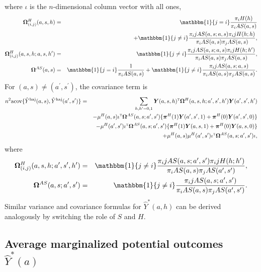 \documentclass{article}
\def\T{{\textsc{t}}}
\newcommand{\acov}{\textup{acov}}
\newcommand{\bY}{\boldsymbol{Y}}
\newcommand{\bpi}{\boldsymbol{\pi}}
\newcommand{\bOmega}{\boldsymbol{\Omega}}
\newcommand{\haj}{\textup{haj}}
\newcommand{\indicator}{\mathbbm{1}}
\newcommand{\ashprime}{a^{\prime},s^{\prime},h^{\prime}}
\newcommand{\pscore}[1]{\pi_{#1}}
\begin{document}
where $\iota$ is the $n$-dimensional column vector with all ones, 
\begin{eqnarray*}
    \bOmega^{H}_{(i,j)}(a,s,h) &=& \indicator\{j=i\} \frac{\pscore{i}{H}(h)}{\pscore{i}{AS}(a,s)} \\
    &&+ \indicator\{j\neq i\} \frac{\pscore{i}{j}{AS}(a,s;a,s)\pscore{i}{j}{H}(h;h)}{\pscore{i}{AS}(a,s)\pscore{j}{}{AS}(a,s)}, \\
    \bOmega^{H}_{(i,j)}(a,s,h;a,s,h^{\prime}) &=& \indicator\{j\neq i\} \frac{\pscore{i}{j}{AS}(a,s;a,s)\pscore{i}{j}{H}(h;h^{\prime})}{\pscore{i}{AS}(a,s)\pscore{j}{}{AS}(a,s)}, \\
    \bOmega^{AS}(a,s) &=& \indicator\{j=i\}\frac{1}{\pscore{i}{AS}(a,s)} + \indicator\{j\neq i\} \frac{\pscore{i}{j}{AS}(a,s;a,s)}{\pscore{i}{AS}(a,s)\pscore{j}{}{AS}(a,s)}.
\end{eqnarray*}
For $(a,s)\neq(a^{\prime},s^{\prime})$, the covariance term is
\begin{eqnarray*}
    n^2\acov\{\hat Y^{\haj}(a,s), \hat Y^{\haj}(a^{\prime},s^{\prime})\} &=& \sum_{h,h^{\prime} = 0,1} \bY(a,s,h)^{\T} \bOmega^{H}(a,s,h;\ashprime)\bY(\ashprime) \\
    &&- \mu^{H}(a,s) \iota^{\T} \bOmega^{AS}(a,s;a^{\prime},s^{\prime}) \{\bpi^{H}(1) \bY(a^{\prime},s^{\prime},1) + \bpi^{H}(0) \bY(a^{\prime},s^{\prime},0)\} \\
    &&- \mu^{H}(a^{\prime},s^{\prime}) \iota^{\T} \bOmega^{AS}(a,s;a^{\prime},s^{\prime}) \{\bpi^{H}(1) \bY(a,s,1) + \bpi^{H}(0) \bY(a,s,0)\} \\
    &&+ \mu^{H}(a,s)\mu^{H}(a^{\prime},s^{\prime}) \iota^{\T} \bOmega^{AS}(a,s;a^{\prime},s^{\prime}) \iota,
\end{eqnarray*}
where
\begin{eqnarray*}
    \bOmega^{H}_{(i,j)}(a,s,h;\ashprime) &=& \indicator\{j\neq i\} \frac{\pscore{i}{j}{AS}(a,s;a^{\prime},s^{\prime})\pscore{i}{j}{H}(h;h^{\prime})}{\pscore{i}{AS}(a,s)\pscore{j}{}{AS}(a^{\prime},s^{\prime})}, \\
    \bOmega^{AS}(a,s;a^{\prime},s^{\prime}) &=& \indicator\{j\neq i\} \frac{\pscore{i}{j}{AS}(a,s;a^{\prime},s^{\prime})}{\pscore{i}{AS}(a,s)\pscore{j}{}{AS}(a^{\prime},s^{\prime})}.
\end{eqnarray*}
Similar variance and covariance formulas for $\hat Y^{*}(a,h)$ can be derived analogously by switching the role of $S$ and $H$.


\subsection{Average marginalized potential outcomes $\hat Y^{*}(a)$}
\end{document}
